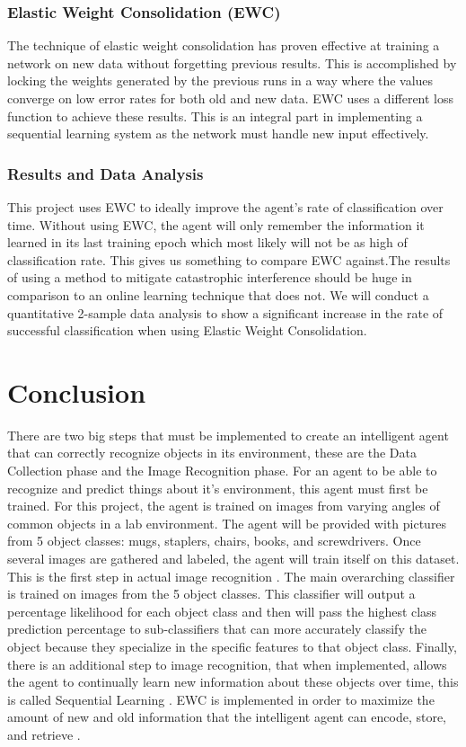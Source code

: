 \documentclass[draftclsnofoot, onecolumn, 10pt, compsoc]{IEEEtran}
\begin{document}
			\subsubsection{Elastic Weight Consolidation (EWC)}
				The technique of elastic weight consolidation has proven effective at training a network on new data without forgetting previous results. This is accomplished by locking the weights generated by the previous runs in a way where the values converge on low error rates for both old and new data. EWC uses a different loss function to achieve these results. This is an integral part in implementing a sequential learning system as the network must handle new input effectively.

			\subsubsection{Results and Data Analysis}
				This project uses EWC to ideally improve the agent's rate of classification over time. Without using EWC, the agent will only remember the information it learned in its last training epoch which most likely will not be as high of classification rate. This gives us something to compare EWC against.The results of using a method to mitigate catastrophic interference should be huge in comparison to an online learning technique that does not. We will conduct a quantitative 2-sample data analysis to show a significant increase in the rate of successful classification when using Elastic Weight Consolidation.

	\section{Conclusion}
		There are two big steps that must be implemented to create an intelligent agent that can correctly recognize objects in its environment, these are the Data Collection phase and the Image Recognition phase. For an agent to be able to recognize and predict things about it's environment, this agent must first be trained. For this project, the agent is trained on images from varying angles of common objects in a lab environment. The agent will be provided with pictures from 5 object classes: mugs, staplers, chairs, books, and screwdrivers. Once several images are gathered and labeled, the agent will train itself on this dataset. This is the first step in actual image recognition \cite{ImgRecog}. The main overarching classifier is trained on images from the 5 object classes. This classifier will output a percentage likelihood for each object class and then will pass the highest class prediction percentage to sub-classifiers that can more accurately classify the object because they specialize in the specific features to that object class. Finally, there is an additional step to image recognition, that when implemented, allows the agent to continually learn new information about these objects over time, this is called Sequential Learning \cite{Kirkpatrick}. EWC is implemented in order to maximize the amount of new and old information that the intelligent agent can encode, store, and retrieve \cite{McDermott}.
\end{document}
